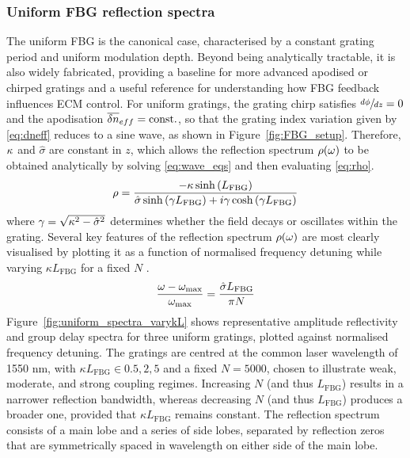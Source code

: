 \subsubsection*{Uniform FBG reflection spectra}
\label{subsubsec:FBG_feedback}
%
The uniform FBG is the canonical case, characterised by a constant grating period and uniform modulation depth.
Beyond being analytically tractable, it is also widely fabricated, providing a baseline for more advanced apodised or chirped gratings and a useful reference for understanding how FBG feedback influences ECM control.
For uniform gratings, the grating chirp satisfies $\sfrac{d\phi}{dz} = 0$ and the apodisation $\overline{\delta n}_{eff} = \text{const.}$, so that the grating index variation given by \eqref{eq:dneff} reduces to a sine wave, as shown in Figure~\ref{fig:FBG_setup}.
Therefore, $\kappa$ and $\hat{\sigma}$ are constant in $z$, which allows the reflection spectrum $\rho(\omega)$ to be obtained analytically by solving \eqref{eq:wave_eqs} and then evaluating \eqref{eq:rho}.
%
\begin{equation}
\label{eq:uniform_rho}
    \rho = \frac{-\kappa \sinh\left( L_\text{FBG}\right)}{\hat{\sigma} \sinh\left(\gamma L_\text{FBG}\right) + i\gamma \cosh\left(\gamma L_\text{FBG}\right)}
\end{equation}
%
where $\gamma = \sqrt{\kappa^2 - \hat{\sigma}^2}$ determines whether the field decays or oscillates within the grating. 
Several key features of the reflection spectrum $\rho(\omega)$ are most clearly visualised by plotting it as a function of normalised frequency detuning while varying $\kappa L_\text{FBG}$ for a fixed $N$ \cite{erdogan1997fiber}.
%
\begin{equation*}
    \frac{\omega - \omega_\text{max}}{\omega_\text{max}} = \frac{\hat{\sigma} L_\text{FBG}  }{\pi N}
\end{equation*}
%
Figure~\ref{fig:uniform_spectra_varykL} shows representative amplitude reflectivity and group delay spectra for three uniform gratings, plotted against normalised frequency detuning. 
The gratings are centred at the common laser wavelength of 1550 nm, with $\kappa L_\text{FBG} \in {0.5, 2, 5}$ and a fixed $N = 5000$, chosen to illustrate weak, moderate, and strong coupling regimes.
Increasing $N$ (and thus $L_\text{FBG}$) results in a narrower reflection bandwidth, whereas decreasing $N$ (and thus $L_\text{FBG}$) produces a broader one, provided that $\kappa L_\text{FBG}$ remains constant.
The reflection spectrum consists of a main lobe and a series of side lobes, separated by reflection zeros that are symmetrically spaced in wavelength on either side of the main lobe.

